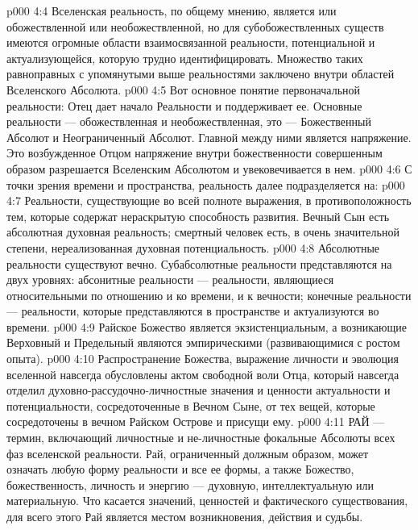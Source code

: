 \vs p000 4:4 \bibnobreakspace {} Вселенская реальность, по общему мнению, является или обожествленной или необожествленной, но для субобожествленных существ имеются огромные области взаимосвязанной реальности, потенциальной и актуализующейся, которую трудно идентифицировать. Множество таких равноправных с упомянутыми выше реальностями заключено внутри областей Вселенского Абсолюта.
\vs p000 4:5 Вот основное понятие первоначальной реальности: Отец дает начало Реальности и поддерживает ее. Основные  реальности --- обожествленная и необожествленная, это --- Божественный Абсолют и Неограниченный Абсолют. Главной  между ними является напряжение. Это возбужденное Отцом напряжение внутри божественности совершенным образом разрешается Вселенским Абсолютом и увековечивается в нем.
\vs p000 4:6 \pc С точки зрения времени и пространства, реальность далее подразделяется на:
\vs p000 4:7 \bibnobreakspace {} Реальности, существующие во всей полноте выражения, в противоположность тем, которые содержат нераскрытую способность развития. Вечный Сын есть абсолютная духовная реальность; смертный человек есть, в очень значительной степени, нереализованная духовная потенциальность.
\vs p000 4:8 \bibnobreakspace {} Абсолютные реальности существуют вечно. Субабсолютные реальности представляются на двух уровнях: абсонитные реальности --- реальности, являющиеся относительными по отношению и ко времени, и к вечности; конечные реальности --- реальности, которые представляются в пространстве и актуализуются во времени.
\vs p000 4:9 \bibnobreakspace {} Райское Божество является экзистенциальным, а возникающие Верховный и Предельный являются эмпирическими (развивающимися с ростом опыта).
\vs p000 4:10 \bibnobreakspace {} Распространение Божества, выражение личности и эволюция вселенной навсегда обусловлены актом свободной воли Отца, который навсегда отделил духовно\hyp{}рассудочно\hyp{}личностные значения и ценности актуальности и потенциальности, сосредоточенные в Вечном Сыне, от тех вещей, которые сосредоточены в вечном Райском Острове и присущи ему.
\vs p000 4:11 \pc РАЙ --- термин, включающий личностные и не\hyp{}личностные фокальные Абсолюты всех фаз вселенской реальности. Рай, ограниченный должным образом, может означать любую форму реальности и все ее формы, а также Божество, божественность, личность и энергию --- духовную, интеллектуальную или материальную. Что касается значений, ценностей и фактического существования, для всего этого Рай является местом возникновения, действия и судьбы.
